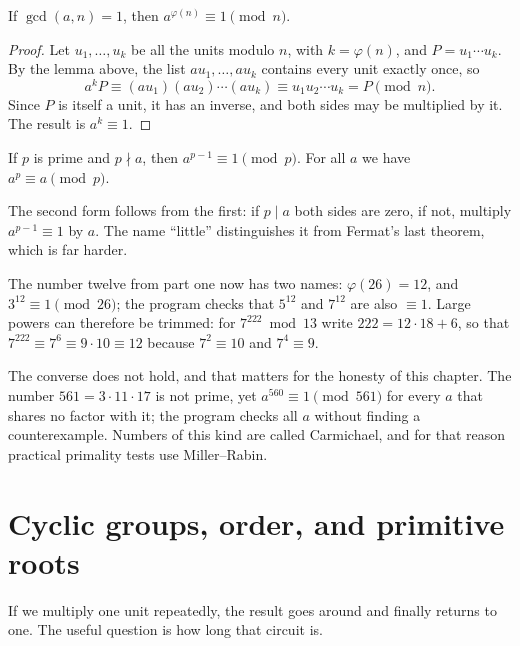 \begin{teorema}[Euler]
If $\gcd(a,n)=1$, then $a^{\varphi(n)}\equiv1\pmod n$.
\end{teorema}

\begin{proof}
Let $u_1,\dots,u_k$ be all the units modulo $n$, with $k=\varphi(n)$, and $P=u_1\cdots u_k$. By the
lemma above, the list $au_1,\dots,au_k$ contains every unit exactly once, so
\[
a^kP\equiv(au_1)(au_2)\cdots(au_k)\equiv u_1u_2\cdots u_k=P\pmod n .
\]
Since $P$ is itself a unit, it has an inverse, and both sides may be multiplied by it. The result is
$a^k\equiv1$.
\end{proof}

\begin{akibat}
If $p$ is prime and $p\nmid a$, then $a^{p-1}\equiv1\pmod p$. For all $a$ we have
$a^p\equiv a\pmod p$.
\end{akibat}

The second form follows from the first: if $p\mid a$ both sides are zero, if not, multiply
$a^{p-1}\equiv1$ by $a$. The name ``little'' distinguishes it from Fermat's last theorem, which is
far harder.

The number twelve from part one now has two names: $\varphi(26)=12$, and $3^{12}\equiv1\pmod{26}$;
the program checks that $5^{12}$ and $7^{12}$ are also $\equiv1$. Large powers can therefore be
trimmed: for $7^{222}\bmod13$ write $222=12\cdot18+6$, so that $7^{222}\equiv7^6\equiv9\cdot10\equiv12$
because $7^2\equiv10$ and $7^4\equiv9$.

The converse does not hold, and that matters for the honesty of this chapter. The number
$561=3\cdot11\cdot17$ is not prime, yet $a^{560}\equiv1\pmod{561}$ for every $a$ that shares no
factor with it; the program checks all $a$ without finding a counterexample. Numbers of this kind are
called Carmichael, and for that reason practical primality tests use Miller--Rabin.


\section{Cyclic groups, order, and primitive roots}

If we multiply one unit repeatedly, the result goes around and finally returns to one. The useful
question is how long that circuit is.

